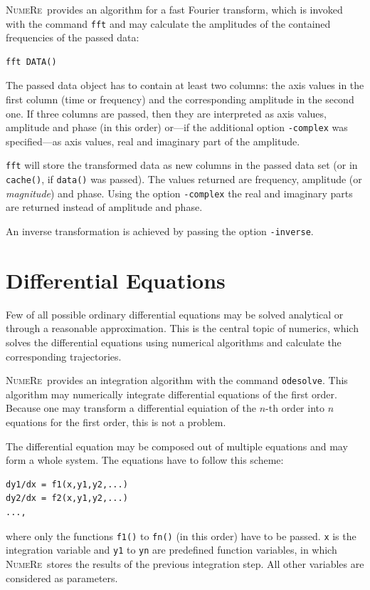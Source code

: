 \documentclass[DIV=14,headsepline,footsepline]{scrbook}
\newcommand{\NR}{\textsc{Nu\-me\-Re}}
\begin{document}
				\NR\ provides an algorithm for a fast Fourier transform, which is invoked with the command \verb+fft+ and may calculate the amplitudes of the contained frequencies of the passed data:
				\begin{lstlisting}
fft DATA()
				\end{lstlisting}
				The passed data object has to contain at least two columns: the axis values in the first column (time or frequency) and the corresponding amplitude in the second one. If three columns are passed, then they are interpreted as axis values, amplitude and phase (in this order) or---if the additional option \verb+-complex+ was specified---as axis values, real and imaginary part of the amplitude.
				
				\verb+fft+ will store the transformed data as new columns in the passed data set (or in \verb+cache()+, if \verb+data()+ was passed). The values returned are frequency, amplitude (or \emph{magnitude}) and phase. Using the option \verb+-complex+ the real and imaginary parts are returned instead of amplitude and phase.
				
				An inverse transformation is achieved by passing the option \verb+-inverse+.
				
			\section{Differential Equations}
				Few of all possible ordinary differential equations may be solved analytical or through a reasonable approximation. This is the central topic of numerics, which solves the differential equations using numerical algorithms and calculate the corresponding trajectories.
				
				\NR\ provides an integration algorithm with the command \verb+odesolve+. This algorithm may numerically integrate differential equations of the first order. Because one may transform a differential equiation of the $n$-th order into $n$ equations for the first order, this is not a problem.
				
				The differential equation may be composed out of multiple equations and may form a whole system. The equations have to follow this scheme:
				\begin{lstlisting}
dy1/dx = f1(x,y1,y2,...)
dy2/dx = f2(x,y1,y2,...)
...,				
				\end{lstlisting}
				where only the functions \verb+f1()+ to \verb+fn()+ (in this order) have to be passed. \verb+x+ is the integration variable and \verb+y1+ to \verb+yn+ are predefined function variables, in which \NR\ stores the results of the previous integration step. All other variables are considered as parameters.
	
\end{document}
